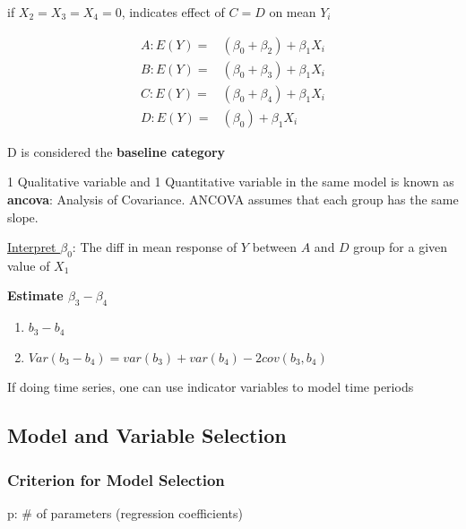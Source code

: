\documentclass[11pt]{article}
\begin{document}
if \(X_2 = X_3 = X_4 = 0\), indicates effect of \(C = D\) on mean \(Y_i\)

\begin{equation}
\begin{split}
A: E(Y) = & (\beta_0 + \beta_2) + \beta_1 X_i\\
B: E(Y) = & (\beta_0 + \beta_3) + \beta_1 X_i\\
C: E(Y) = & (\beta_0 + \beta_4) + \beta_1 X_i\\
D: E(Y) = & (\beta_0) + \beta_1 X_i
\end{split}
\end{equation}

D is considered the \textbf{baseline category}

1 Qualitative variable and 1 Quantitative variable in the same model is known as
\textbf{ancova}: Analysis of Covariance. ANCOVA assumes that each group has the same slope.


\uline{Interpret \(\beta_0\)}: The diff in mean response of \(Y\) between \(A\) and \(D\)
group for a given value of \(X_1\)

\textbf{Estimate \(\beta_3 - \beta_4\)}
\begin{enumerate}
\item \(b_3 - b_4\)
\item \(Var(b_3 - b_4) = var(b_3) + var(b_4) - 2 cov(b_3, b_4)\)
\end{enumerate}

If doing time series, one can use indicator variables to model time periods

\subsection{Model and Variable Selection}
\label{sec:org18bdbe7}
\subsubsection{Criterion for Model Selection}
\label{sec:org4889f28}
p: \# of parameters (regression coefficients)
\end{document}
